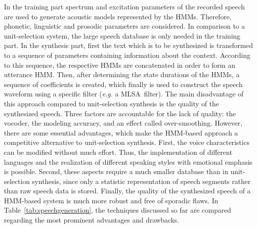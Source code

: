 In the training part spectrum and excitation parameters %
of the recorded speech are used to generate acoustic models represented by the \acp{HMM}. Therefore, phonetic, linguistic and prosodic parameters are considered. In comparison to a unit-selection system, the large speech database is only needed in the training part. In the synthesis part, first the text which is to be synthesized is transformed to a sequence of parameters containing information about the context. %
According to this sequence, the respective \acp{HMM} are concatenated in order to form an utterance \ac{HMM}. Then, after determining the state durations of the \acp{HMM}, a sequence of coefficients is created, which finally is used to construct the speech waveform using a specific filter (\textit{e.g.} a \ac{MLSA}~filter). The main disadvantage of this approach compared to unit-selection synthesis is the quality of the synthesized speech. Three factors are accountable for the lack of quality: the vocoder, the modeling accuracy, and an effect called over-smoothing. However, there are some essential advantages, which make the \ac{HMM}-based approach a competitive alternative to unit-selection synthesis. First, the voice characteristics can be modified without much effort. Thus, the implementation of different languages and the realization of different speaking styles with emotional emphasis is possible. Second, these aspects require a much smaller database than in unit-selection synthesis, since only a statistic representation of speech segments rather than raw speech data is stored. Finally, the quality of the synthesized speech of a \ac{HMM}-based system is much more robust and free of sporadic flaws. In Table~\ref{tab:speechgeneration}, the techniques discussed so far are compared regarding the most prominent advantages and drawbacks.


\begin{table}[h]
	\caption{Comparison of speech generation methods~\cite{hinterleitner:quality, black:statistical}}
	\label{tab:speechgeneration}
	\vspace{-0.75em}
		\vspace{-0.75em}
\end{table}
	
